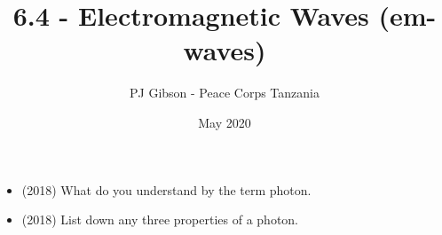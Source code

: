 \documentclass{article}
\title{\textbf{6.4 - Electromagnetic Waves (em-waves)}}
\author{PJ Gibson - Peace Corps Tanzania}
\date{May 2020}
\begin{document}
\maketitle

\begin{itemize}
\item (2018)  What do you understand by the term photon. 
\item (2018)  List down any three properties of a photon. 
\end{itemize}
\end{document}
